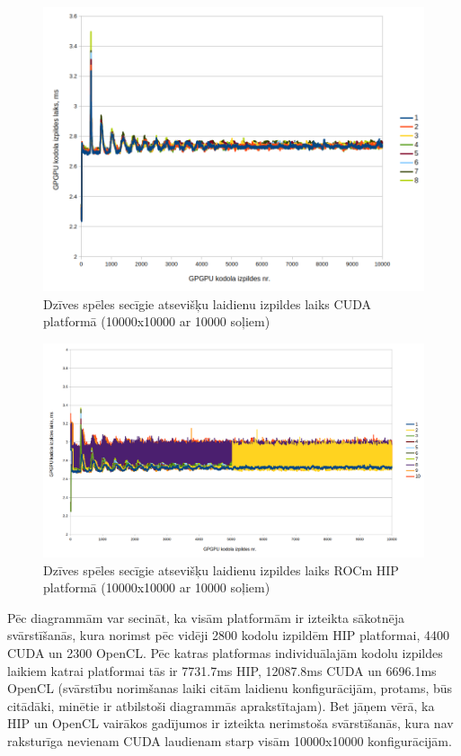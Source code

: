 \begin{figure}[H] \centering
    \includegraphics[width=\textwidth]{images/gol_cuda_consecutive_runs_10k_by_10k_10ksteps.png}
    \caption{Dzīves spēles secīgie atsevišķu laidienu izpildes laiks CUDA 
    platformā (10000x10000 ar 10000 soļiem)}
    \label{img:consecutive_kernel_exec_gol_cuda}
\end{figure}


\begin{figure}[H] \centering
    \includegraphics[width=\textwidth]{images/gol_hip_consecutive_runs_10k_by_10k_10ksteps.png}
    \caption{Dzīves spēles secīgie atsevišķu laidienu izpildes laiks ROCm HIP
    platformā (10000x10000 ar 10000 soļiem)}
    \label{img:consecutive_kernel_exec_gol_hip}
\end{figure}

Pēc diagrammām var secināt, ka visām platformām ir izteikta sākotnēja
svārstīšanās, kura norimst pēc vidēji 2800 kodolu izpildēm HIP platformai, 4400
CUDA un 2300 OpenCL. Pēc katras platformas individuālajām kodolu izpildes
laikiem katrai platformai tās ir 7731.7\si{\ms} HIP, 12087.8\si{\ms} CUDA un
6696.1\si{\ms} OpenCL (svārstību norimšanas laiki citām laidienu
konfigurācijām, protams, būs citādāki, minētie ir atbilstoši diagrammās
aprakstītajam). Bet jāņem vērā, ka HIP un OpenCL vairākos gadījumos ir izteikta
nerimstoša svārstīšanās, kura nav raksturīga nevienam CUDA laudienam starp
visām 10000x10000 konfigurācijām. 

